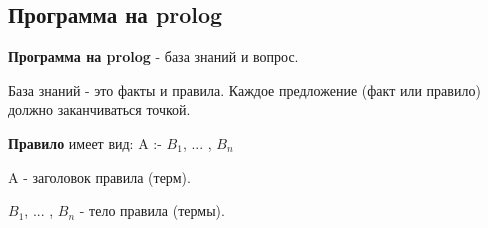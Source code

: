 \documentclass[a4paper,oneside,12pt]{extreport}
\begin{document}


\subsection*{Программа на prolog}

\textbf{Программа на prolog} - база знаний и вопрос. 

База знаний - это факты и правила. Каждое предложение (факт или правило) должно заканчиваться точкой.

\textbf{Правило} имеет вид:
    A :- $B_1$, ... , $B_n$
    
A - заголовок правила (терм).

$B_1$, ... , $B_n$ - тело правила (термы). 
\end{document}
